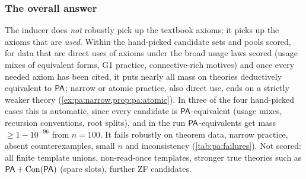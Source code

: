 \subsubsection{The overall answer}\label{sec:pa:answer}

The inducer does \emph{not} robustly pick up the textbook axioms; it picks up the axioms that are \emph{used}. Within the hand-picked candidate sets and pools scored, for data that are direct uses of axioms under the broad usage laws scored (usage mixes of equivalent forms, G1 practice, connective-rich motives) and once every needed axiom has been cited, it puts nearly all mass on theories deductively equivalent to $\mathsf{PA}$; narrow or atomic practice, also direct use, ends on a strictly weaker theory (\cref{ex:pa:narrow,prop:pa:atomic}). In three of the four hand-picked cases this is automatic, since every candidate is $\mathsf{PA}$-equivalent (usage mixes, recursion conventions, root splits), and in the \DTRC{} run $\mathsf{PA}$-equivalents get mass $\ge1-10^{-96}$ from $n=100$. It fails robustly on theorem data, narrow practice, absent counterexamples, small $n$ and inconsistency (\cref{tab:pa:failures}). Not scored: all finite template unions, non-read-once templates, stronger true theories such as $\mathsf{PA}+\mathrm{Con}(\mathsf{PA})$ (spare slots), further ZF candidates.
